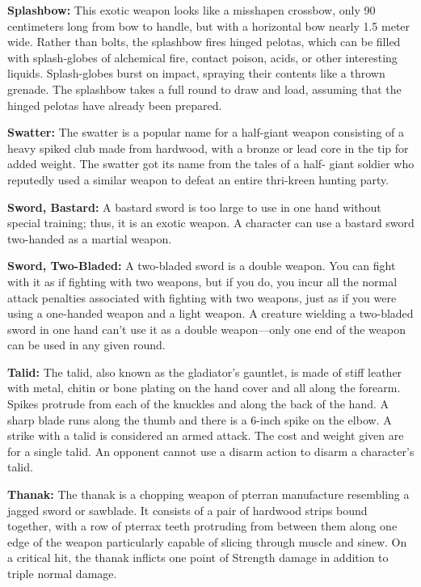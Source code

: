 \textbf{Splashbow:} This exotic weapon looks like a misshapen crossbow, only 90 centimeters long from bow to handle, but with a horizontal bow nearly 1.5 meter wide. Rather than bolts, the splashbow fires hinged pelotas, which can be filled with splash-globes of alchemical fire, contact poison, acids, or other interesting liquids. Splash-globes burst on impact, spraying their contents like a thrown grenade. The splashbow takes a full round to draw and load, assuming that the hinged pelotas have already been prepared.

\textbf{Swatter:} The swatter is a popular name for a half-giant weapon consisting of a heavy spiked club made from hardwood, with a bronze or lead core in the tip for added weight. The swatter got its name from the tales of a half- giant soldier who reputedly used a similar weapon to defeat an entire thri-kreen hunting party.

\textbf{Sword, Bastard:} A bastard sword is too large to use in one hand without special training; thus, it is an exotic weapon. A character can use a bastard sword two-handed as a martial weapon. 

\textbf{Sword, Two-Bladed:} A two-bladed sword is a double weapon. You can fight with it as if fighting with two weapons, but if you do, you incur all the normal attack penalties associated with fighting with two weapons, just as if you were using a one-handed weapon and a light weapon. A creature wielding a two-bladed sword in one hand can't use it as a double weapon---only one end of the weapon can be used in any given round. 

\textbf{Talid:} The talid, also known as the gladiator's gauntlet, is made of stiff leather with metal, chitin or bone plating on the hand cover and all along the forearm. Spikes protrude from each of the knuckles and along the back of the hand. A sharp blade runs along the thumb and there is a 6-inch spike on the elbow. A strike with a talid is considered an armed attack. The cost and weight given are for a single talid. An opponent cannot use a disarm action to disarm a character's talid.

\textbf{Thanak:} The thanak is a chopping weapon of pterran manufacture resembling a jagged sword or sawblade. It consists of a pair of hardwood strips bound together, with a row of pterrax teeth protruding from between them along one edge of the weapon particularly capable of slicing through muscle and sinew. On a critical hit, the thanak inflicts one point of Strength damage in addition to triple normal damage.


